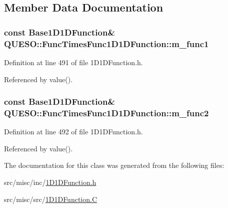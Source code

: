 \subsection{Member Data Documentation}
\hypertarget{class_q_u_e_s_o_1_1_func_times_func1_d1_d_function_aaed9e10d4e9b28cbc56fc486847d3dc1}{
\subsubsection[{m\-\_\-func1}]{\setlength{\rightskip}{0pt plus 5cm}const {\bf Base1\-D1\-D\-Function}\& Q\-U\-E\-S\-O\-::\-Func\-Times\-Func1\-D1\-D\-Function\-::m\-\_\-func1\hspace{0.3cm}{\ttfamily [protected]}}}\label{class_q_u_e_s_o_1_1_func_times_func1_d1_d_function_aaed9e10d4e9b28cbc56fc486847d3dc1}


Definition at line 491 of file 1\-D1\-D\-Function.\-h.



Referenced by value().

\hypertarget{class_q_u_e_s_o_1_1_func_times_func1_d1_d_function_a20c159912d7fbea580b10ff8f6ec7365}{
\subsubsection[{m\-\_\-func2}]{\setlength{\rightskip}{0pt plus 5cm}const {\bf Base1\-D1\-D\-Function}\& Q\-U\-E\-S\-O\-::\-Func\-Times\-Func1\-D1\-D\-Function\-::m\-\_\-func2\hspace{0.3cm}{\ttfamily [protected]}}}\label{class_q_u_e_s_o_1_1_func_times_func1_d1_d_function_a20c159912d7fbea580b10ff8f6ec7365}


Definition at line 492 of file 1\-D1\-D\-Function.\-h.



Referenced by value().



The documentation for this class was generated from the following files\-:\begin{DoxyCompactItemize}
\item 
src/misc/inc/\hyperlink{1_d1_d_function_8h}{1\-D1\-D\-Function.\-h}\item 
src/misc/src/\hyperlink{1_d1_d_function_8_c}{1\-D1\-D\-Function.\-C}\end{DoxyCompactItemize}
